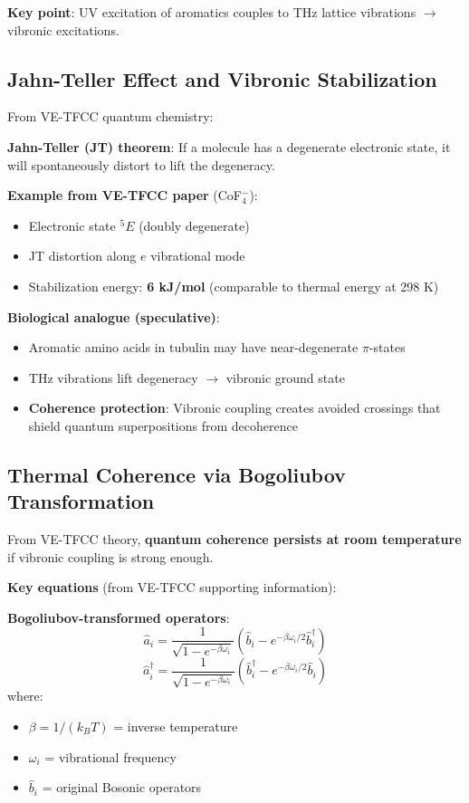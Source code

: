 \textbf{Key point}: UV excitation of aromatics couples to THz lattice vibrations $\rightarrow$ vibronic excitations.

\subsection{Jahn-Teller Effect and Vibronic Stabilization}\label{jahn-teller-effect-and-vibronic-stabilization}

From VE-TFCC quantum chemistry:

\textbf{Jahn-Teller (JT) theorem}: If a molecule has a degenerate
electronic state, it will spontaneously distort to lift the degeneracy.

\textbf{Example from VE-TFCC paper} (CoF$_4^-$):
\begin{itemize}
\item Electronic state $^5E$ (doubly degenerate)
\item JT distortion along $e$ vibrational mode
\item Stabilization energy: \textbf{6 kJ/mol} (comparable to thermal energy at 298 K)
\end{itemize}

\textbf{Biological analogue (speculative)}:
\begin{itemize}
\item Aromatic amino acids in tubulin may have near-degenerate $\pi$-states
\item THz vibrations lift degeneracy $\rightarrow$ vibronic ground state
\item \textbf{Coherence protection}: Vibronic coupling creates avoided crossings that shield quantum superpositions from decoherence
\end{itemize}

\subsection{Thermal Coherence via Bogoliubov Transformation}\label{thermal-coherence-via-bogoliubov-transformation}

From VE-TFCC theory, \textbf{quantum coherence persists at room
temperature} if vibronic coupling is strong enough.

\textbf{Key equations} (from VE-TFCC supporting information):

\textbf{Bogoliubov-transformed operators}:
\begin{equation}
\label{eq:bogoliubov-a}
\hat{a}_i = \frac{1}{\sqrt{1 - e^{-\beta \omega_i}}} \left( \hat{b}_i - e^{-\beta \omega_i/2} \hat{b}_i^\dagger \right)
\end{equation}
\begin{equation}
\label{eq:bogoliubov-a-dag}
\hat{a}_i^\dagger = \frac{1}{\sqrt{1 - e^{-\beta \omega_i}}} \left( \hat{b}_i^\dagger - e^{-\beta \omega_i/2} \hat{b}_i \right)
\end{equation}
where:
\begin{itemize}
\item $\beta = 1/(k_B T)$ = inverse temperature
\item $\omega_i$ = vibrational frequency
\item $\hat{b}_i$ = original Bosonic operators
\end{itemize}

